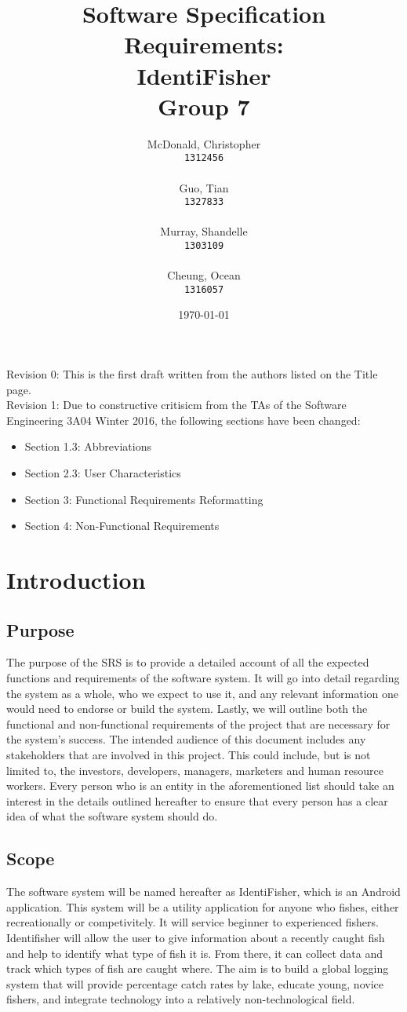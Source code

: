 \documentclass{article}
\title{Software Specification Requirements: \\ IdentiFisher \\ Group 7 \\}
\author{
\Large McDonald, Christopher\\
\texttt{1312456} \\ \\
\Large Guo, Tian\\
\texttt{1327833} \\ \\
\Large Murray, Shandelle\\
\texttt{1303109} \\ \\
\Large Cheung, Ocean\\
\texttt{1316057} \\
}
\date{\today}
\begin{document}
\maketitle

\newpage
\tableofcontents
\vfill
\noindent Revision 0: This is the first draft written from the authors listed on the Title page. \\
Revision 1: Due to constructive critisicm from the TAs of the Software Engineering 3A04 Winter 2016, the following sections have been changed:

\begin{itemize}
	\item Section 1.3: Abbreviations
	\item Section 2.3: User Characteristics 
	\item Section 3: Functional Requirements Reformatting
	\item Section 4: Non-Functional Requirements
\end{itemize}
\pagebreak
\section{Introduction}

\subsection{Purpose}
The purpose of the SRS is to provide a detailed account of all the expected functions
and requirements of the software system. It will go into detail regarding the system
as a whole, who we expect to use it, and any relevant information one would need
to endorse or build the system. Lastly, we will outline both the functional and
non-functional requirements of the project that are necessary for the system's
success. The intended audience of this document includes any stakeholders that are involved in this
project. This could include, but is not limited to, the investors, developers, managers,
marketers and human resource workers. Every person who is an entity in the aforementioned
list should take an interest in the details outlined hereafter to ensure that every person
has a clear idea of what the software system should do.

\subsection{Scope}
The software system will be named hereafter as IdentiFisher, which is an Android application.
This system will be a utility application for anyone who fishes, either recreationally or
competivitely. It will service beginner to experienced fishers. Identifisher will allow
the user to give information about a recently caught fish and help to identify what type
of fish it is. From there, it can collect data and track which types of fish are caught where. The aim is to
build a global logging system that will provide percentage catch rates by lake,
educate young, novice fishers, and integrate technology into a relatively non-technological field.
\end{document}
